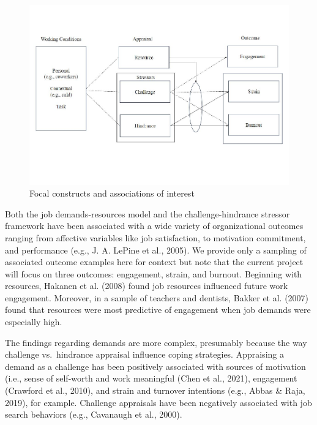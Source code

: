 \documentclass[
  man,mask]{apa7}
\begin{document}
\begin{figure}
\centering
\includegraphics{Submission_files/figure-latex/ourmodel-1.pdf}
\caption{\label{fig:ourmodel}Focal constructs and associations of interest}
\end{figure}

Both the job demands-resources model and the challenge-hindrance stressor framework have been associated with a wide variety of organizational outcomes ranging from affective variables like job satisfaction, to motivation commitment, and performance (e.g., J. A. LePine et al., 2005). We provide only a sampling of associated outcome examples here for context but note that the current project will focus on three outcomes: engagement, strain, and burnout. Beginning with resources, Hakanen et al. (2008) found job resources influenced future work engagement. Moreover, in a sample of teachers and dentists, Bakker et al. (2007) found that resources were most predictive of engagement when job demands were especially high.

The findings regarding demands are more complex, presumably because the way challenge vs.~hindrance appraisal influence coping strategies. Appraising a demand as a challenge has been positively associated with sources of motivation (i.e., sense of self-worth and work meaningful (Chen et al., 2021), engagement (Crawford et al., 2010), and strain and turnover intentions (e.g., Abbas \& Raja, 2019), for example. Challenge appraisals have been negatively associated with job search behaviors (e.g., Cavanaugh et al., 2000).
\end{document}
